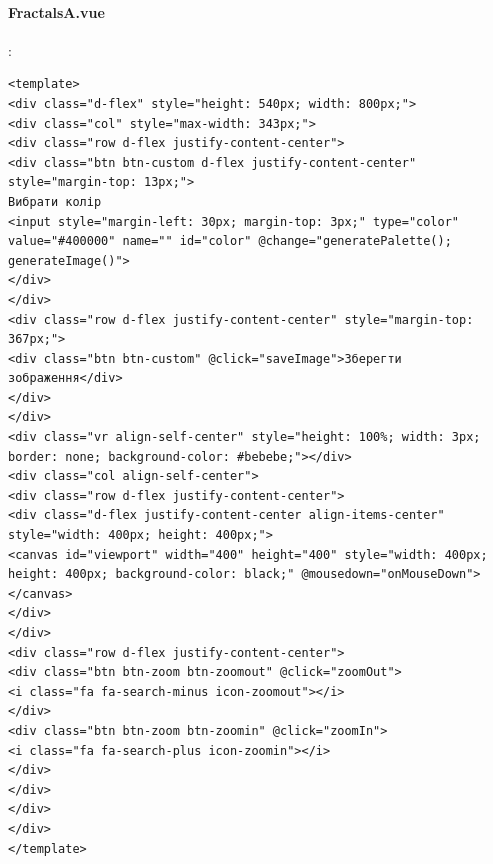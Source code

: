 \documentclass[oneside,14pt]{extarticle}
\begin{document}
\begin{normalsize}
	\paragraph{FractalsA.vue}
	:
	\begin{tiny}
		\begin{lstlisting}
<template>
<div class="d-flex" style="height: 540px; width: 800px;">
<div class="col" style="max-width: 343px;">
<div class="row d-flex justify-content-center">
<div class="btn btn-custom d-flex justify-content-center" style="margin-top: 13px;">
Вибрати колір
<input style="margin-left: 30px; margin-top: 3px;" type="color" value="#400000" name="" id="color" @change="generatePalette(); generateImage()">
</div>
</div>
<div class="row d-flex justify-content-center" style="margin-top: 367px;">
<div class="btn btn-custom" @click="saveImage">Зберегти зображення</div>
</div>
</div>
<div class="vr align-self-center" style="height: 100%; width: 3px; border: none; background-color: #bebebe;"></div>
<div class="col align-self-center">
<div class="row d-flex justify-content-center">
<div class="d-flex justify-content-center align-items-center" style="width: 400px; height: 400px;">
<canvas id="viewport" width="400" height="400" style="width: 400px; height: 400px; background-color: black;" @mousedown="onMouseDown"></canvas>
</div>
</div>
<div class="row d-flex justify-content-center">
<div class="btn btn-zoom btn-zoomout" @click="zoomOut">
<i class="fa fa-search-minus icon-zoomout"></i>
</div>
<div class="btn btn-zoom btn-zoomin" @click="zoomIn">
<i class="fa fa-search-plus icon-zoomin"></i>
</div>
</div>
</div>
</div>
</template>


\end{lstlisting}
\end{tiny}
\end{normalsize}
\end{document}
